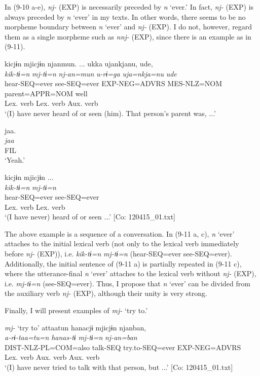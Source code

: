 In (9-10 a-e), \textit{nj-} (EXP) is necessarily preceded by \textit{n} ‘ever.’ In fact, \textit{nj-} (EXP) is always preceded by \textit{n} ‘ever’ in my texts. In other words, there seems to be no morpheme boundary between \textit{n} ‘ever’ and \textit{nj-} (EXP). I do not, however, regard them as a single morpheme such as \textit{nnj-} (EXP), since there is an example as in (9-11).

\ea    \label{ex:9.11}
\ea\label{ex:9.11a} %
     \gllll kicjɨn  mjicjɨn  njanmun.  ...  ukka  ujankjanu,  ude,\\
      \textit{kik-tɨ=n}  \textit{mj-tɨ=n}  \textit{nj{}-an=mun}    \textit{u-rɨ=ga}    \textit{uja=nkja=nu}  \textit{ude}\\
      hear-SEQ=ever  see-SEQ=ever  EXP-NEG=ADVRS    MES-NLZ=NOM  parent=APPR=NOM  well\\
      {Lex. verb}  {Lex. verb}  {Aux. verb}\\
    \glt      ‘(I) have never heard of or seen (him). That person’s parent was, ...’

\ex\label{ex:9.11b} %
      \glll jaa.\\
      \textit{jaa}\\
      FIL\\
    \glt  ‘Yeah.’  

\ex \label{ex:9.11c} %
     \gllll     kicjɨn  mjicjɨn  ...  \\
      \textit{kik-tɨ=n}  \textit{mj-tɨ=n}    \\
      hear-SEQ=ever  see-SEQ=ever    \\
      {Lex. verb}  {Lex. verb}    \\
      \glt       ‘(I have never) heard of or seen ...’   [Co: 120415\_01.txt]
    \z
\z

The above example is a sequence of a conversation. In (9-11 a, c), \textit{n} ‘ever’ attaches to the initial lexical verb (not only to the lexical verb immediately before \textit{nj-} (EXP)), i.e. \textit{kik-tɨ=n} \textit{mj-tɨ=n} (hear-SEQ=ever see-SEQ=ever). Additionally, the initial sentence of (9-11 a) is partially repeated in (9-11 c), where the utterance-final \textit{n} ‘ever’ attaches to the lexical verb without \textit{nj-} (EXP), i.e. \textit{mj-tɨ=n} (see-SEQ=ever). Thus, I propose that \textit{n} ‘ever’ can be divided from the auxiliary verb \textit{nj-} (EXP), although their unity is very strong.

  Finally, I will present examples of \textit{mj-} ‘try to.’

\ea   \textit{mj-} ‘try to’ \label{ex:9.12}
\ea \label{ex:9.12a}%
 \gllll  attaatun  hanacjɨ  mjicjɨn  njanban,\\
      \textit{a-rɨ-taa=tu=n}  \textit{hanas-tɨ}  \textit{mj{}-tɨ=n}  \textit{nj-an=ban}\\
      DIST-NLZ-PL=COM=also  talk-SEQ  try.to-SEQ=ever  EXP-NEG=ADVRS\\
        {Lex. verb}  {Aux. verb}  {Aux. verb}\\
      \glt       ‘(I) have never tried to talk with that person, but ...’ [Co: 120415\_01.txt]

